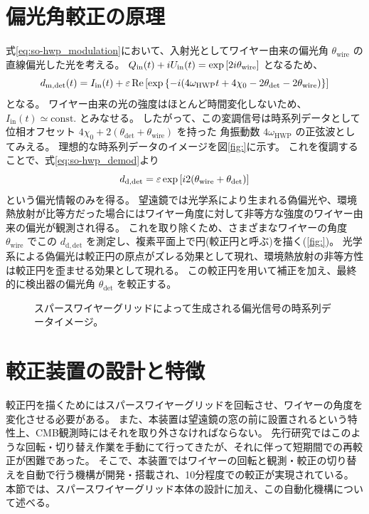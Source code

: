 \documentclass[../../main.tex]{subfiles}
\begin{document}
\section{偏光角較正の原理}
式\eqref{eq:so-hwp_modulation}において、入射光としてワイヤー由来の偏光角 $\theta_{\mathrm{wire}}$ の直線偏光した光を考える。
$Q_{\mathrm{in}}(t) + iU_{\mathrm{in}}(t) = \exp\qty[2i\theta_{\mathrm{wire}}]$ となるため、
\begin{equation}
    d_{\mathrm{m}, \mathrm{det}}(t) = I_{\mathrm{in}}(t) + \varepsilon\Re\qty[\exp\qty{-i \qty(4\omega_{\mathrm{HWP}}t + 4\chi_0 - 2\theta_{\mathrm{det}} - 2\theta_{\mathrm{wire}})}]
\end{equation}
となる。
ワイヤー由来の光の強度はほとんど時間変化しないため、$I_{\mathrm{in}}(t) \simeq \mathrm{const.}$ とみなせる。
したがって、この変調信号は時系列データとして位相オフセット $4\chi_0 + 2(\theta_{\mathrm{det}} + \theta_{\mathrm{wire}})$ を持った
角振動数 $4\omega_{\mathrm{HWP}}$ の正弦波としてみえる。
理想的な時系列データのイメージを図\ref{fig:}に示す。
これを復調することで、式\eqref{eq:so-hwp_demod}より
\begin{equation}
    d_{\mathrm{d, det}} = \varepsilon\exp\qty[i2\qty(\theta_{\mathrm{wire}} + \theta_{\mathrm{det}})]
\end{equation}
という偏光情報のみを得る。
望遠鏡では光学系により生まれる偽偏光や、環境熱放射が比等方だった場合にはワイヤー角度に対して非等方な強度のワイヤー由来の偏光が観測され得る。
これを取り除くため、さまざまなワイヤーの角度 $\theta_{\mathrm{wire}}$ でこの $d_{\mathrm{d, det}}$ を測定し、複素平面上で円(較正円と呼ぶ)を描く(\ref{fig:})。
光学系による偽偏光は較正円の原点がズレる効果として現れ、環境熱放射の非等方性は較正円を歪ませる効果として現れる。
この較正円を用いて補正を加え、最終的に検出器の偏光角 $\theta_{\mathrm{det}}$ を較正する。
\begin{figure}
    \centering
    \caption[スパースワイヤーグリッドによって生成される偏光信号の時系列データイメージ]{スパースワイヤーグリッドによって生成される偏光信号の時系列データイメージ。}
\end{figure}
\section{較正装置の設計と特徴}
較正円を描くためにはスパースワイヤーグリッドを回転させ、ワイヤーの角度を変化させる必要がある。
また、本装置は望遠鏡の窓の前に設置されるという特性上、CMB観測時にはそれを取り外さなければならない。
先行研究ではこのような回転・切り替え作業を手動にて行ってきたが、それに伴って短期間での再較正が困難であった。
そこで、本装置ではワイヤーの回転と観測・較正の切り替えを自動で行う機構が開発・搭載され、10分程度での較正が実現されている。
本節では、スパースワイヤーグリッド本体の設計に加え、この自動化機構について述べる。
\end{document}

